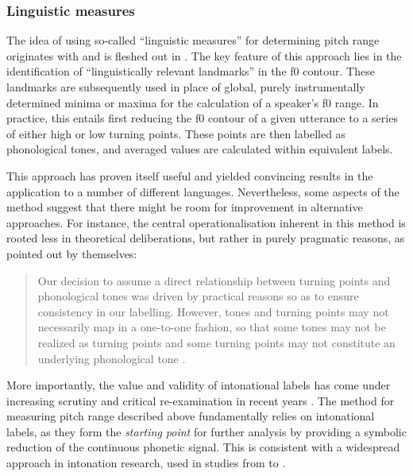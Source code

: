	\subsubsection{Linguistic measures}\label{int_back_measures_linguistic}


The idea of using so-called ``linguistic measures'' for determining pitch range originates with \citet{laddModellingIntraandInterspeaker1995} and is fleshed out in \citet{pattersonLinguisticApproachPitch2000}. The key feature of this approach lies in the identification of ``linguistically relevant landmarks'' \citep{mennenCrosslanguageDifferencesFundamental2012a} in the f0 contour. These landmarks are subsequently used in place of global, purely instrumentally determined minima or maxima for the calculation of a speaker's f0 range.
In practice, this entails first reducing the f0 contour of a given utterance to a series of either high or low turning points. These points are then labelled as phonological tones, and averaged values are calculated within equivalent labels.

This approach has proven itself useful and yielded convincing results in the application to a number of different languages. Nevertheless, some aspects of the method suggest that there might be room for improvement in alternative approaches. For instance, the central operationalisation inherent in this method is rooted less in theoretical deliberations, but rather in purely pragmatic reasons, as pointed out by \citet{mennenCrosslanguageDifferencesFundamental2012a} themselves:

\begin{quote}
	Our decision to assume a direct relationship between turning points and phonological tones was driven by practical reasons so as to ensure consistency in our labelling. However, tones and turning points may not necessarily map in a one-to-one fashion, so that some tones may not be realized as turning points and some turning points may not constitute an underlying phonological tone \citep[footnote 3]{mennenCrosslanguageDifferencesFundamental2012a}.
\end{quote}

More importantly, the value and validity of intonational labels has come under increasing scrutiny and critical re-examination in recent years \citep[see the contributions in][]{dimperioAdvancingProsodicTranscription2016}. The method for measuring pitch range described above fundamentally relies on intonational labels, as they form the \emph{starting point} for further analysis by providing a symbolic reduction of the continuous phonetic signal. This is consistent with a widespread approach in intonation research, used in studies from \citet{hirstIntonationSystemsSurvey1998} to \citet{hualdeInternationalProsodicAlphabet2016}.

